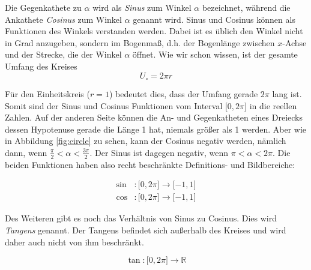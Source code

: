 Die Gegenkathete zu $\alpha$ wird als \textsl{Sinus} zum Winkel $\alpha$ bezeichnet, während die Ankathete \textsl{Cosinus} zum Winkel $\alpha$ genannt wird. Sinus und Cosinus können als Funktionen des Winkels verstanden werden. Dabei ist es üblich den Winkel nicht in Grad anzugeben, sondern im Bogenmaß, d.h. der Bogenlänge zwischen $x$-Achse und der Strecke, die der Winkel $\alpha$ öffnet. Wie wir schon wissen, ist der gesamte Umfang des Kreises
\[
U_\circ  = 2\pi r
\]

Für den Einheitskreis ($r=1$) bedeutet dies, dass der Umfang gerade $2\pi$ lang ist. Somit sind der Sinus und Cosinus Funktionen vom Interval $\lbrack 0 , 2\pi \rbrack$ in die reellen Zahlen. Auf der anderen Seite können die An- und Gegenkatheten eines Dreiecks dessen Hypotenuse gerade die Länge 1 hat, niemals größer als 1 werden. Aber wie in Abbildung \ref{fig:circle} zu sehen, kann der Cosinus negativ werden, nämlich dann, wenn $\frac{\pi}{2} < \alpha < \frac{3\pi}{2}$. Der Sinus ist dagegen negativ, wenn $\pi < \alpha < 2\pi$. Die beiden Funktionen haben also recht beschränkte Definitions- und Bildbereiche:

\begin{equation}
\begin{split}
\sin &: \lbrack 0 , 2\pi \rbrack \longrightarrow \lbrack -1 , 1 \rbrack \\
\cos &: \lbrack 0 , 2\pi \rbrack \longrightarrow \lbrack -1 , 1 \rbrack
\end{split}
\end{equation}

Des Weiteren gibt es noch das Verhältnis von Sinus zu Cosinus. Dies wird \textsl{Tangens} genannt. Der Tangens befindet sich außerhalb des Kreises und wird daher auch nicht von ihm beschränkt. 

\begin{equation*}
\tan : \lbrack 0 , 2\pi \rbrack \longrightarrow \mathbb{R}
\end{equation*}
